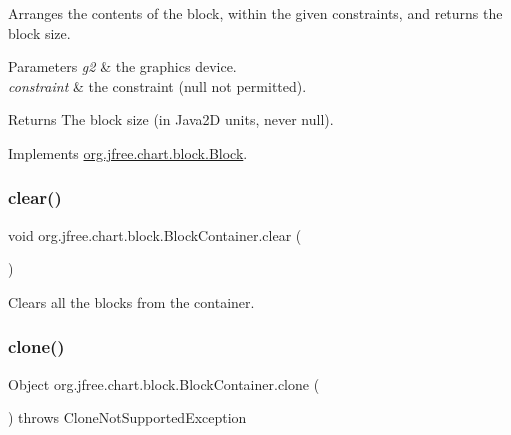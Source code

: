 Arranges the contents of the block, within the given constraints, and returns the block size.


\begin{DoxyParams}{Parameters}
{\em g2} & the graphics device. \\
\hline
{\em constraint} & the constraint ({\ttfamily null} not permitted).\\
\hline
\end{DoxyParams}
\begin{DoxyReturn}{Returns}
The block size (in Java2D units, never {\ttfamily null}). 
\end{DoxyReturn}


Implements \mbox{\hyperlink{interfaceorg_1_1jfree_1_1chart_1_1block_1_1_block_ab4cabbc237c5277a4a0018bab930e5fe}{org.\+jfree.\+chart.\+block.\+Block}}.

\mbox{\label{classorg_1_1jfree_1_1chart_1_1block_1_1_block_container_ae061e9cab96f1cd114b35e7e6b619a8a}} 
\subsubsection{\texorpdfstring{clear()}{clear()}}
{\footnotesize\ttfamily void org.\+jfree.\+chart.\+block.\+Block\+Container.\+clear (\begin{DoxyParamCaption}{ }\end{DoxyParamCaption})}

Clears all the blocks from the container. \mbox{\label{classorg_1_1jfree_1_1chart_1_1block_1_1_block_container_a3e852a0973be203fe120e358c1a03938}} 
\subsubsection{\texorpdfstring{clone()}{clone()}}
{\footnotesize\ttfamily Object org.\+jfree.\+chart.\+block.\+Block\+Container.\+clone (\begin{DoxyParamCaption}{ }\end{DoxyParamCaption}) throws Clone\+Not\+Supported\+Exception}

